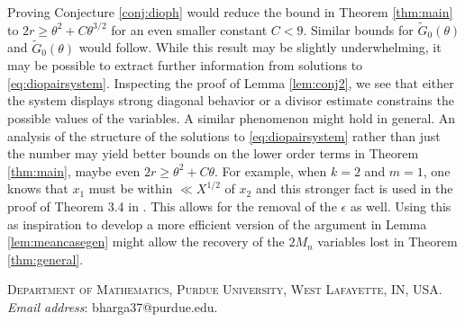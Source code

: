 \documentclass[11pt,reqno]{amsart}
\numberwithin{equation}{section}
\begin{document}
Proving Conjecture \ref{conj:dioph} would reduce the bound in Theorem \ref{thm:main} to $2r \geq \theta^2 +C\theta^{3/2}$ for an even smaller constant $C < 9$. Similar bounds for $\widetilde{G}_0(\theta)$ and $ \widetilde{G}_0(\theta)$ would follow. While this result may be slightly underwhelming, it may be possible to extract further information from solutions to \eqref{eq:diopairsystem}. Inspecting the proof of Lemma \ref{lem:conj2}, we see that either the system displays strong diagonal behavior or a divisor estimate constrains the possible values of the variables. A similar phenomenon might hold in general. 
An analysis of the structure of the solutions to \eqref{eq:diopairsystem} rather than just the number may yield better bounds on the lower order terms in Theorem \ref{thm:main}, maybe even $2r \geq \theta^2 +C\theta$. For example, when $k=2$ and $m=1$, one knows that $x_1$ must be within $\ll X^{1/2}$ of $x_2$ and this stronger fact is used in the proof of Theorem 3.4 in \cite{Poulias1}. This allows for the removal of the $\epsilon$ as well. Using this as inspiration to develop a more efficient version of the argument in Lemma \ref{lem:meancasegen} might allow the recovery of the $2M_n$ variables lost in Theorem \ref{thm:general}. 









\noindent\textsc{Department of Mathematics, Purdue University, West Lafayette, IN, USA.}
\vspace{.03in}
\newline\noindent\textit{Email address}: bharga37@purdue.edu. 
\end{document}
